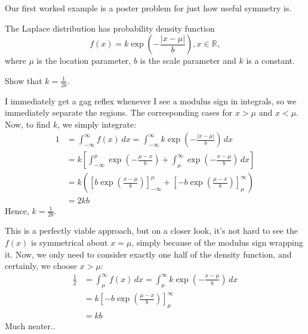\documentclass[../main.tex]{subfiles}
\begin{document}
Our first worked example is a poster problem for just how useful symmetry is.
\begin{example}[Classic]
The Laplace distribution has probability density function
$$f(x)=k\exp{\left(-\frac{|x-\mu|}{b}\right)}, x \in \mathbb{R},$$
where $\mu$ is the location parameter, $b$ is the scale parameter and $k$ is a constant.

Show that $k=\frac{1}{2b}.$
\end{example}
I immediately get a gag reflex whenever I see a modulus sign in integrals, so we immediately separate the regions. The corresponding cases for $x > \mu$ and $x < \mu$. Now, to find $k$, we simply integrate:
\begin{align*}
    1&=\int_{-\infty}^{\infty}f(x) \,dx = \int_{-\infty}^{\infty}k\exp{\left(-\frac{|x-\mu|}{b}\right)} \,dx \\
    &= k\left[\int_{-\infty}^{\mu} \exp{\left(-\frac{\mu-x}{b}\right)}+\int_{\mu}^{\infty}\exp{\left(-\frac{x-\mu}{b}\right)}\,dx \right] \\
    &=k\left(\left[b\exp{\left(\frac{x-\mu}{b}\right)}\right]_{-\infty}^{\mu}+\left[-b\exp{\left(\frac{\mu-x}{b}\right)}\right]_{\mu}^{\infty}\right) \\
    &= 2kb
\end{align*}
Hence, $k=\frac{1}{2b}$.

This is a perfectly viable approach, but on a closer look, it's not hard to see the $f(x)$ is symmetrical about $x=\mu$, simply because of the modulus sign wrapping it. Now, we only need to consider exactly one half of the density function, and certainly, we choose $x > \mu$:
\begin{align*}
    \frac{1}{2}&=\int_{\mu}^{\infty}f(x) \,dx = \int_{\mu}^{\infty}k\exp{\left(-\frac{x-\mu}{b}\right)} \,dx \\
    &=k\left[-b\exp{\left(\frac{\mu-x}{b}\right)}\right]_{\mu}^{\infty} \\
    &=kb
\end{align*}
Much neater..
\end{document}
